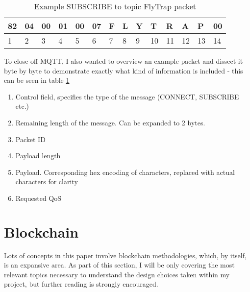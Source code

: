 \begin{table}[]
\centering
\begin{tabular}{llllllllllllll}
\hline
\multicolumn{1}{|l|}{82} & \multicolumn{1}{l|}{04} & \multicolumn{1}{l|}{00} & \multicolumn{1}{l|}{01} & \multicolumn{1}{l|}{00} & \multicolumn{1}{l|}{07} & \multicolumn{1}{l|}{F} & \multicolumn{1}{l|}{L} & \multicolumn{1}{l|}{Y} & \multicolumn{1}{l|}{T} & \multicolumn{1}{l|}{R} & \multicolumn{1}{l|}{A} & \multicolumn{1}{l|}{P} & \multicolumn{1}{l|}{00} \\ \hline
1                        & 2                       & 3                       & 4                       & 5                       & 6                       & 7                      & 8                      & 9                      & 10                     & 11                     & 12                     & 13                     & 14                     
\end{tabular}
\caption{Example SUBSCRIBE to topic FlyTrap packet}
\label{tab:sub_packet}
\end{table}

To close off MQTT, I also wanted to overview an example packet and dissect it byte by byte to demonstrate exactly what kind of information is included - this can be seen in table \ref{tab:sub_packet}
\begin{enumerate}
  \item [1] Control field, specifies the type of the message (CONNECT, SUBSCRIBE etc.)
  \item [2] Remaining length of the message. Can be expanded to 2 bytes.
  \item [3-4] Packet ID
  \item [5-6] Payload length
  \item [7-13] Payload. Corresponding hex encoding of characters, replaced with actual characters for clarity
  \item [14] Requested QoS
\end{enumerate}

\section{Blockchain}

Lots of concepts in this paper involve blockchain methodologies, which, by itself, is an expansive area. As part of this section, I will be only covering the most relevant topics necessary to understand the design choices taken within my project, but further reading is strongly encouraged.

